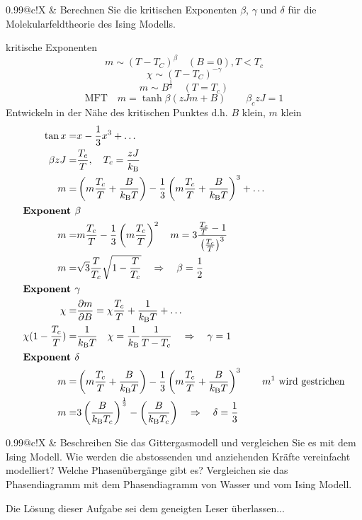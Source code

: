 \documentclass[a4paper,12pt]{scrartcl}
\makeatletter
\def\pf#1#2{\frac{\partial #1}{\partial #2}}		%
\def\ka#1{\left(#1\right)}				%
\def\kB{k_\mathrm{B}}					%
\newcounter{qc}\setcounter{qc}{1}
\newenvironment{fshaded}{
\def\FrameCommand{\fcolorbox{framecolor}{shadecolor}}
\MakeFramed {\FrameRestore}}
{\endMakeFramed}
\def\frage#1{
\begin{fshaded}
\noindent
\begin{tabularx}{0.99\textwidth}{@{}c!{\color{framecolor}\vline}X}
{ \bf \rm \theqc }	&	\noindent #1
\end{tabularx}
\stepcounter{qc}
\end{fshaded}
}
\makeatother
\begin{document}
\frage{Berechnen Sie die kritischen Exponenten $\beta$, $\gamma$ und $\delta$ für die Molekularfeldtheorie des Ising Modells.}
\noindent
kritische Exponenten
\[m\sim\ka{T-T_C}^\beta\quad(B=0), T<T_c \]
\[\chi\sim\ka{T-T_C}^{-\gamma} \]
\[m\sim B^{\frac1\delta}\quad(T=T_c)\]
\[\text{MFT}\quad m=\tanh\beta(zJm+B)\qquad\beta_czJ=1\]
Entwickeln in der Nähe des kritischen Punktes d.h. $B$ klein, $m$ klein
\begin{align*}
	\tan x=&x-\frac13x^3+\ldots\\
	\beta zJ=&\frac{T_c}T,\quad T_c=\frac{zJ}{\kB }\\
	m=&\ka{m\frac{T_c}T+\frac B{\kB T}}-\frac13\ka{m\frac{T_c}T+\frac B{\kB T}}^3+\ldots\\
	\intertext{\bf Exponent $\beta$}
	m=&m\frac{T_c}T-\frac13\ka{m\frac{T_c}T}^2\quad m=3\frac{\frac{T_c}T-1}{\ka{\frac{T_c}T}^3}\\
	m=&\sqrt 3\frac T{T_c}\sqrt{1-\frac T{T_c}}\quad\Rightarrow\quad\beta=\frac12\\
	\intertext{\bf Exponent $\gamma$}
	\chi=&\pf mB=\chi\frac{T_c}T+\frac1{\kB T}+\ldots\\
	\chi(1-\frac{T_c}T)=&\frac1{\kB T}\quad\chi=\frac1{\kB }\frac1{T-T_c}\quad\Rightarrow\quad\gamma=1\\
	\intertext{\bf Exponent $\delta$}
	m=&\ka{m\frac{T_c}T+\frac B{\kB T}}-\frac13\ka{m\frac{T_c}T+\frac B{\kB T}}^3\qquad\text{$m^1$ wird gestrichen}\\
	m=&3\ka{\frac B{\kB T_c}}^{\frac13}-\ka{\frac B{\kB T_c}}\quad\Rightarrow\quad\delta=\frac13
\end{align*}


\frage{Beschreiben Sie das Gittergasmodell und vergleichen Sie es mit dem Ising Modell. Wie werden die abstossenden und 
anziehenden Kräfte vereinfacht modelliert? Welche Phasenübergänge gibt es? Vergleichen sie das
Phasendiagramm mit dem Phasendiagramm von Wasser und vom Ising Modell.}
\noindent
Die Lösung dieser Aufgabe sei dem geneigten Leser überlassen...
\end{document}
